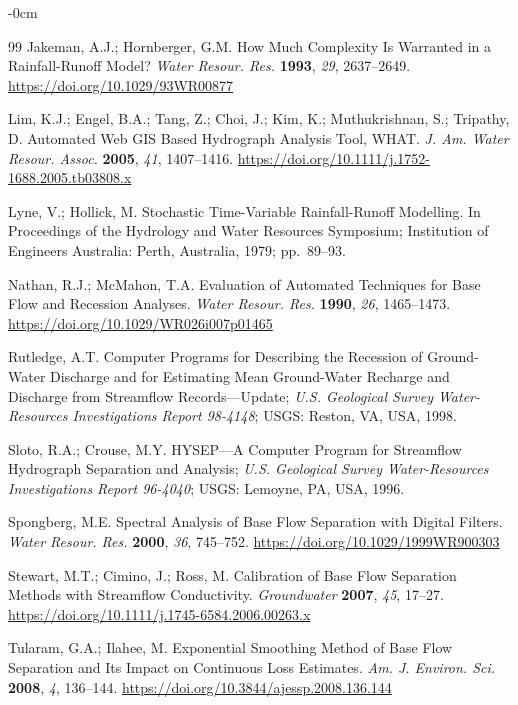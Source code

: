 \documentclass[hydrology,article,submit,pdftex,moreauthors]{Definitions/mdpi}
\begin{document}
\begin{adjustwidth}{-\extralength}{0cm}
\begin{thebibliography}{99}
Jakeman, A.J.; Hornberger, G.M. How Much Complexity Is Warranted in a Rainfall-Runoff Model? \textit{Water Resour. Res.} \textbf{1993}, \textit{29}, 2637--2649. \url{https://doi.org/10.1029/93WR00877}

Lim, K.J.; Engel, B.A.; Tang, Z.; Choi, J.; Kim, K.; Muthukrishnan, S.; Tripathy, D. Automated Web GIS Based Hydrograph Analysis Tool, WHAT. \textit{J. Am. Water Resour. Assoc.} \textbf{2005}, \textit{41}, 1407--1416. \url{https://doi.org/10.1111/j.1752-1688.2005.tb03808.x}

Lyne, V.; Hollick, M. Stochastic Time-Variable Rainfall-Runoff Modelling. In Proceedings of the Hydrology and Water Resources Symposium; Institution of Engineers Australia: Perth, Australia, 1979; pp.~89--93.

Nathan, R.J.; McMahon, T.A. Evaluation of Automated Techniques for Base Flow and Recession Analyses. \textit{Water Resour. Res.} \textbf{1990}, \textit{26}, 1465--1473. \url{https://doi.org/10.1029/WR026i007p01465}

Rutledge, A.T. Computer Programs for Describing the Recession of Ground-Water Discharge and for Estimating Mean Ground-Water Recharge and Discharge from Streamflow Records---Update; \textit{U.S. Geological Survey Water-Resources Investigations Report 98-4148}; USGS: Reston, VA, USA, 1998.

Sloto, R.A.; Crouse, M.Y. HYSEP---A Computer Program for Streamflow Hydrograph Separation and Analysis; \textit{U.S. Geological Survey Water-Resources Investigations Report 96-4040}; USGS: Lemoyne, PA, USA, 1996.

Spongberg, M.E. Spectral Analysis of Base Flow Separation with Digital Filters. \textit{Water Resour. Res.} \textbf{2000}, \textit{36}, 745--752. \url{https://doi.org/10.1029/1999WR900303}

Stewart, M.T.; Cimino, J.; Ross, M. Calibration of Base Flow Separation Methods with Streamflow Conductivity. \textit{Groundwater} \textbf{2007}, \textit{45}, 17--27. \url{https://doi.org/10.1111/j.1745-6584.2006.00263.x}

Tularam, G.A.; Ilahee, M. Exponential Smoothing Method of Base Flow Separation and Its Impact on Continuous Loss Estimates. \textit{Am. J. Environ. Sci.} \textbf{2008}, \textit{4}, 136--144. \url{https://doi.org/10.3844/ajessp.2008.136.144}


\end{thebibliography}
\end{adjustwidth}
\end{document}
